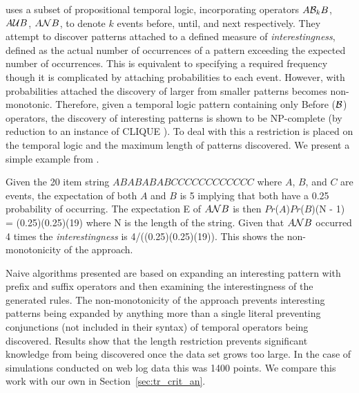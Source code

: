 \medskip
{}
\cite{bt98} uses a subset of propositional temporal logic,
incorporating operators
$A {\cal B}_k B$, $A {\cal U} B$, $A {\cal N} B$, to denote $k$ events
before, until, and next respectively. They attempt to discover patterns
attached to
a defined measure of {\em interestingness}, defined as the actual
number of occurrences of a pattern exceeding the expected number of
occurrences. This is equivalent to specifying a required frequency
though it is complicated by attaching probabilities to each event.
However, with probabilities attached the discovery of  larger from smaller
patterns becomes non-monotonic. Therefore, given a temporal logic
pattern containing only Before (${\cal B}$) operators, the discovery of
interesting patterns is shown to be NP-complete (by reduction to an
instance of CLIQUE \cite{gj79}). To deal with this a
restriction is placed on the temporal logic and the maximum length of patterns
discovered. We present a simple example from \cite{bt98}.

\begin{example}
\begin{rm}
Given the 20 item string $ABABABABCCCCCCCCCCCC$ where $A$, $B$, and $C$ are
events, the expectation of both $A$ and $B$ is 5 implying that both have a 0.25
probability of occurring. The expectation E of 
$A {\cal N} B$ is then 
$Pr$($A$)$Pr$($B$)(N - 1) = (0.25)(0.25)(19) where N is the length of
the string.  Given that $A {\cal N} B$
occurred 4 times the {\em interestingness} is 4/((0.25)(0.25)(19)). This
shows the non-monotonicity of the approach.
\end{rm}
\end{example}

Naive algorithms presented are based on expanding an
interesting pattern with prefix and suffix operators and then
examining the interestingness of the generated rules. The
non-monotonicity of the approach prevents interesting patterns being
expanded by anything more than a single literal preventing
conjunctions (not included in their syntax) of temporal operators
being discovered. Results show that the length restriction prevents
significant knowledge from being discovered once the data set grows
too large. In the case of simulations conducted on web log data this
was 1400 points. We compare this work with our own in
Section~\ref{sec:tr_crit_an}.


\medskip
{}


